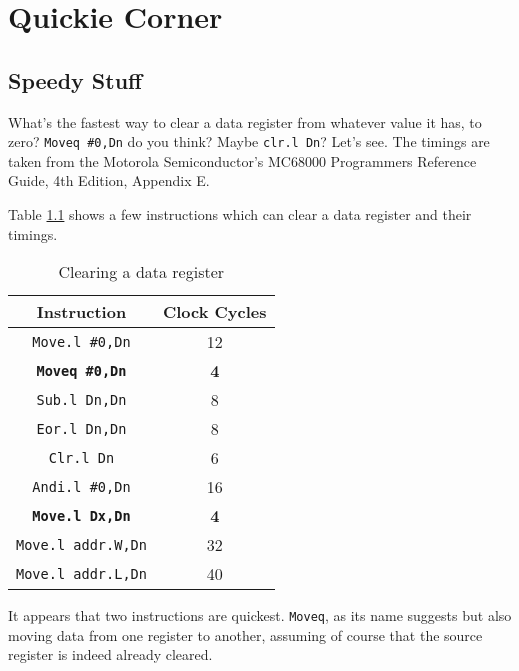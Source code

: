 
\chapter{Quickie Corner}

\section{Speedy Stuff}

What's the fastest way to clear a data register from whatever value
it has, to zero? \texttt{Moveq \#0,Dn} do you think? Maybe \texttt{clr.l
Dn}? Let's see. The timings are taken from the Motorola Semiconductor's
MC68000 Programmers Reference Guide, 4th Edition, Appendix E.

Table \ref{tab:Clearing-a-data-register} shows a few instructions
which can clear a data register and their timings.

\begin{table}[!h]
\begin{centering}
\begin{tabular}{|c|c|}
\hline 
\textbf{Instruction} & \textbf{Clock Cycles}\tabularnewline
\hline 
\hline 
\texttt{Move.l \#0,Dn} & 12\tabularnewline
\hline 
\texttt{\textbf{Moveq \#0,Dn}} & \textbf{4}\tabularnewline
\hline 
\texttt{Sub.l Dn,Dn} & 8\tabularnewline
\hline 
\texttt{Eor.l Dn,Dn} & 8\tabularnewline
\hline 
\texttt{Clr.l Dn} & 6\tabularnewline
\hline 
\texttt{Andi.l \#0,Dn} & 16\tabularnewline
\hline 
\texttt{\textbf{Move.l Dx,Dn}} & \textbf{4}\tabularnewline
\hline 
\texttt{Move.l addr.W,Dn} & 32\tabularnewline
\hline 
\texttt{Move.l addr.L,Dn} & 40\tabularnewline
\hline 
\end{tabular}
\par\end{centering}
\caption{Clearing a data register\label{tab:Clearing-a-data-register}}

\end{table}

It appears that two instructions are quickest. \texttt{Moveq}, as
its name suggests but also moving data from one register to another,
assuming of course that the source register is indeed already cleared.
